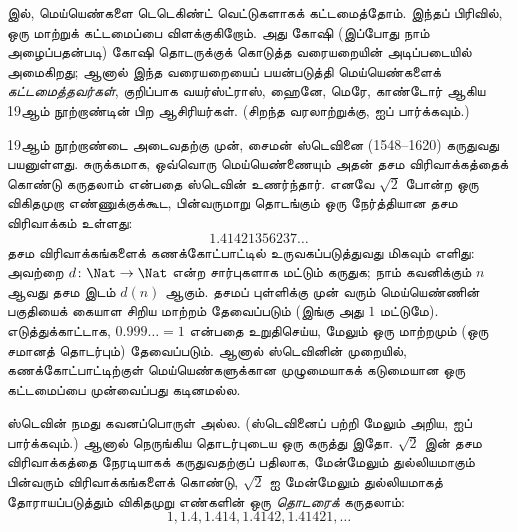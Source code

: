 \documentclass[../../../include/open-logic-section]{subfiles}
\begin{document}


 இல், மெய்யெண்களை டெடெகிண்ட் வெட்டுகளாகக்
கட்டமைத்தோம். இந்தப் பிரிவில், ஒரு மாற்றுக் கட்டமைப்பை விளக்குகிறோம்.
அது கோஷி (இப்போது நாம் அழைப்பதன்படி) கோஷி தொடருக்குக் கொடுத்த
வரையறையின் அடிப்படையில் அமைகிறது;
ஆனால் இந்த வரையறையைப் பயன்படுத்தி மெய்யெண்களைக் \emph{கட்டமைத்தவர்கள்},
குறிப்பாக வயர்ஸ்ட்ராஸ், ஹைனே, மெரே, காண்டோர் ஆகிய
19ஆம் நூற்றாண்டின் பிற ஆசிரியர்கள்.
(சிறந்த வரலாற்றுக்கு, \citeauthor{OConnorRobertson:RN}
\citeyear{OConnorRobertson:RN} ஐப் பார்க்கவும்.)

19ஆம் நூற்றாண்டை அடைவதற்கு முன், சைமன் ஸ்டெவினை (1548--1620)
கருதுவது பயனுள்ளது.
சுருக்கமாக, ஒவ்வொரு மெய்யெண்ணையும் அதன் தசம விரிவாக்கத்தைக் கொண்டு
கருதலாம் என்பதை ஸ்டெவின் உணர்ந்தார்.
எனவே $\sqrt{2}$ போன்ற ஒரு விகிதமுறா எண்ணுக்குக்கூட,
பின்வருமாறு தொடங்கும் ஒரு நேர்த்தியான தசம விரிவாக்கம் உள்ளது:
\[
	1.41421356237\ldots
\]
தசம விரிவாக்கங்களைக் கணக்கோட்பாட்டில் உருவகப்படுத்துவது மிகவும் எளிது:
அவற்றை $d \colon \Nat \to \Nat$ என்ற சார்புகளாக மட்டும் கருதுக;
நாம் கவனிக்கும் $n$ ஆவது தசம இடம் $d(n)$ ஆகும்.
தசமப் புள்ளிக்கு முன் வரும் மெய்யெண்ணின் பகுதியைக் கையாள
சிறிய மாற்றம் தேவைப்படும் (இங்கு அது $1$ மட்டுமே).
எடுத்துக்காட்டாக, $0.999\ldots = 1$ என்பதை உறுதிசெய்ய,
மேலும் ஒரு மாற்றமும் (ஒரு சமானத் தொடர்பும்) தேவைப்படும்.
ஆனால் ஸ்டெவினின் முறையில், கணக்கோட்பாட்டிற்குள் மெய்யெண்களுக்கான
முழுமையாகக் கடுமையான ஒரு கட்டமைப்பை முன்வைப்பது கடினமல்ல.

ஸ்டெவின் நமது கவனப்பொருள் அல்ல.
(ஸ்டெவினைப் பற்றி மேலும் அறிய, \citealt{KatzKatz2012} ஐப் பார்க்கவும்.)
ஆனால் நெருங்கிய தொடர்புடைய ஒரு கருத்து இதோ.
$\sqrt{2}$ இன் தசம விரிவாக்கத்தை நேரடியாகக் கருதுவதற்குப் பதிலாக,
மேன்மேலும் துல்லியமாகும் பின்வரும் விரிவாக்கங்களைக் கொண்டு,
$\sqrt{2}$ ஐ மேன்மேலும் துல்லியமாகத் தோராயப்படுத்தும்
விகிதமுறு எண்களின் ஒரு \emph{தொடரைக்} கருதலாம்:
\[
1, 1.4, 1.414, 1.4142, 1.41421,\ldots
\]
\end{document}
